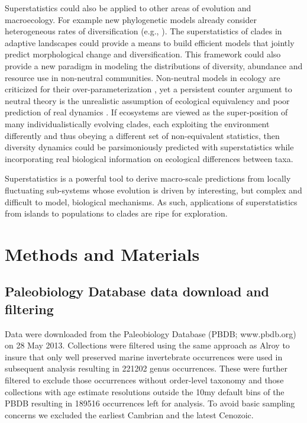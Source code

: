 \documentclass[12pt]{article}
\let\citep=\cite
\begin{document}
Superstatistics could also be applied to other areas of evolution and
macroecology.  For example new phylogenetic models already consider
heterogeneous rates of diversification (e.g.,
\citep{rabosky2006laser}). The superstatistics of clades in adaptive
landscapes could provide a means to build efficient models that
jointly predict morphological change and diversification. This
framework could also provide a new paradigm in modeling the
distributions of diversity, abundance and resource use in non-neutral
communities. Non-neutral models in ecology are criticized for their
over-parameterization \citep{rosindell2011}, yet a persistent counter
argument to neutral theory \citep{hubbell2001} is the unrealistic
assumption of ecological equivalency \citep{chave2004neutral} and poor
prediction of real dynamics \citep{ricklefs2006neutral}. If ecosystems
are viewed as the super-position of many individualistically evolving
clades, each exploiting the environment differently and thus obeying a
different set of non-equivalent statistics, then diversity dynamics
could be parsimoniously predicted with superstatistics while
incorporating real biological information on ecological differences
between taxa.

Superstatistics is a powerful tool to derive macro-scale predictions
from locally fluctuating sub-systems whose evolution is driven by
interesting, but complex and difficult to model, biological
mechanisms. As such, applications of superstatistics from islands to
populations to clades are ripe for exploration.


\section*{Methods and Materials}

\subsection*{Paleobiology Database data download and filtering}
Data were downloaded from the Paleobiology Database (PBDB;
www.pbdb.org) on 28 May 2013. Collections were filtered using the same
approach as Alroy \citep{alroy08} to insure that only well preserved
marine invertebrate occurrences were used in subsequent analysis
resulting in 221202 genus occurrences. These were further filtered to
exclude those occurrences without order-level taxonomy and those
collections with age estimate resolutions outside the 10my default
bins of the PBDB resulting in 189516 occurrences left for analysis. To
avoid basic sampling concerns we excluded the earliest Cambrian and
the latest Cenozoic.
\end{document}
